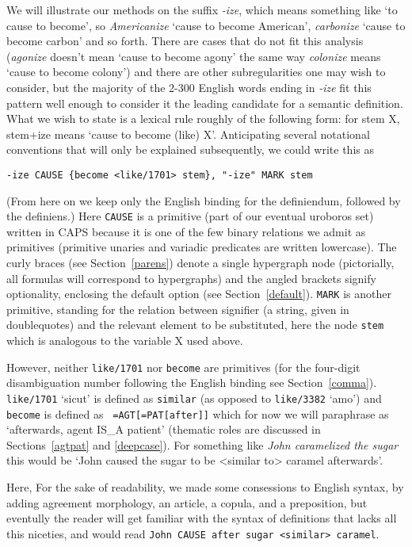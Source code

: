 \documentclass[11pt,bookmarks,bookmarksnumbered,naturalnames,plainpages=false,pdftex,colorlinks=true,urlcolor=blue,bookmarksdepth=subsection,plainpages=false]{paper}
\begin{document}
We will illustrate our methods on the suffix {\it -ize}, which means something
like `to cause to become', so {\it Americanize} `cause to become American',
{\it carbonize} `cause to become carbon' and so forth. There are cases that do
not fit this analysis ({\it agonize} doesn't mean `cause to become agony' the
same way {\it colonize} means `cause to become colony') and there are other
subregularities one may wish to consider, but the majority of the 2-300
English words ending in {\it -ize} fit this pattern well enough to consider it
the leading candidate for a semantic definition. What we wish to state is a
lexical rule roughly of the following form: for stem X, stem+ize means `cause
to become (like) X'. Anticipating several notational conventions that will
only be explained subsequently, we could write this as 

\begin{verbatim}
-ize CAUSE {become <like/1701> stem}, "-ize" MARK stem
\end{verbatim}

\noindent 
(From here on we keep only the English binding for the definiendum, followed
by the definiens.) Here {\tt CAUSE} is a primitive (part of our eventual
uroboros set) written in CAPS because it is one of the few binary relations we
admit as primitives (primitive unaries and variadic predicates are written
lowercase).  The curly braces (see Section~\ref{parens}) denote a single
hypergraph node (pictorially, all formulas will correspond to hypergraphs) and
the angled brackets signify optionality, enclosing the default option (see
Section~\ref{default}). {\tt MARK} is another primitive, standing for the
relation between signifier (a string, given in doublequotes) and the relevant
element to be substituted, here the node {\tt stem} which is analogous to the
variable X used above. 

However, neither {\tt like/1701} nor {\tt become} are primitives (for the
four-digit disambiguation number following the English binding see
Section~\ref{comma}). {\tt like/1701} `sicut' is defined as {\tt similar} (as
opposed to {\tt like/3382} `amo') and {\tt become} is defined as {\tt
  =AGT[=PAT[after]]} which for now we will paraphrase as `afterwards, agent
IS\_A patient' (thematic roles are discussed in Sections~\ref{agtpat} and
\ref{deepcase}). For something like {\it John caramelized the sugar} this 
would be `John caused the sugar to be <similar to> caramel afterwards'. 

Here, For the sake of readability, we made some consessions to English syntax,
by adding agreement morphology, an article, a copula, and a preposition, but
eventully the reader will get familiar with the syntax of definitions that
lacks all this niceties, and would read {\tt John CAUSE after {sugar <similar>
    caramel}}. 
\end{document}
